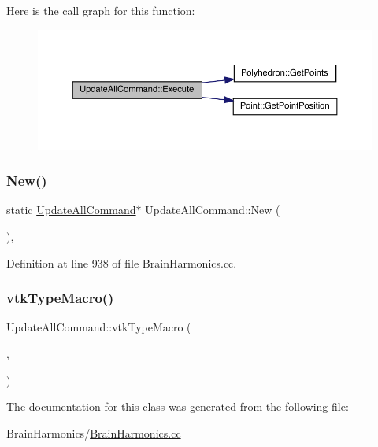Here is the call graph for this function\+:\nopagebreak
\begin{figure}[H]
\begin{center}
\leavevmode
\includegraphics[width=350pt]{class_update_all_command_aa836cd5d538016289656d8118da879c5_cgraph}
\end{center}
\end{figure}
\mbox{\label{class_update_all_command_a97cd6ef1c68bb473aef27c898b175517}} 
\subsubsection{\texorpdfstring{New()}{New()}}
{\footnotesize\ttfamily static \mbox{\hyperlink{class_update_all_command}{Update\+All\+Command}}$\ast$ Update\+All\+Command\+::\+New (\begin{DoxyParamCaption}{ }\end{DoxyParamCaption})\hspace{0.3cm}{\ttfamily [inline]}, {\ttfamily [static]}}



Definition at line 938 of file Brain\+Harmonics.\+cc.

\mbox{\label{class_update_all_command_a228565b2a2306d425dc7eb3cda4d39a4}} 
\subsubsection{\texorpdfstring{vtk\+Type\+Macro()}{vtkTypeMacro()}}
{\footnotesize\ttfamily Update\+All\+Command\+::vtk\+Type\+Macro (\begin{DoxyParamCaption}\item[{\mbox{\hyperlink{class_update_all_command}{Update\+All\+Command}}}]{,  }\item[{vtk\+Command}]{ }\end{DoxyParamCaption})}



The documentation for this class was generated from the following file\+:\begin{DoxyCompactItemize}
\item 
Brain\+Harmonics/\mbox{\hyperlink{_brain_harmonics_8cc}{Brain\+Harmonics.\+cc}}\end{DoxyCompactItemize}
